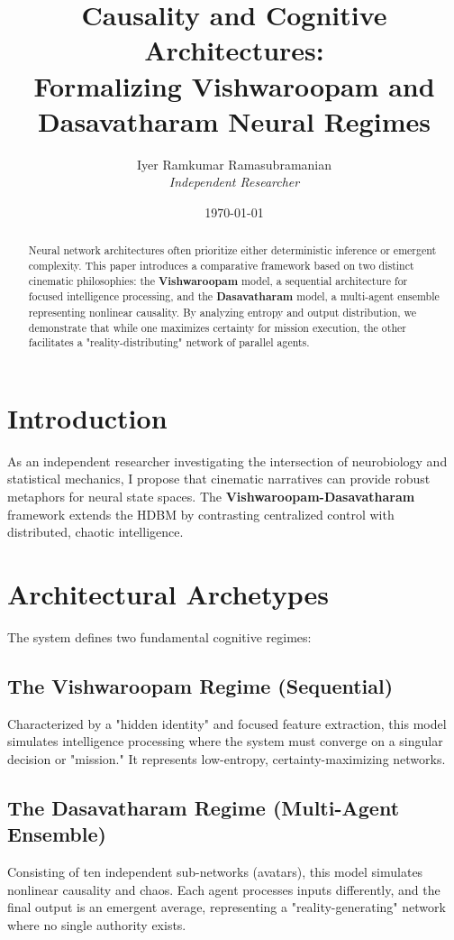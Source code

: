 \documentclass[12pt]{article}
\title{\textbf{Causality and Cognitive Architectures: \\ Formalizing Vishwaroopam and Dasavatharam Neural Regimes}}
\author{Iyer Ramkumar Ramasubramanian \\ \textit{Independent Researcher}}
\date{\today}
\begin{document}
\maketitle

\begin{abstract}
Neural network architectures often prioritize either deterministic inference or emergent complexity. This paper introduces a comparative framework based on two distinct cinematic philosophies: the \textbf{Vishwaroopam} model, a sequential architecture for focused intelligence processing, and the \textbf{Dasavatharam} model, a multi-agent ensemble representing nonlinear causality. By analyzing entropy and output distribution, we demonstrate that while one maximizes certainty for mission execution, the other facilitates a "reality-distributing" network of parallel agents.
\end{abstract}

\section{Introduction}
As an independent researcher investigating the intersection of neurobiology and statistical mechanics, I propose that cinematic narratives can provide robust metaphors for neural state spaces. The \textbf{Vishwaroopam-Dasavatharam} framework extends the HDBM by contrasting centralized control with distributed, chaotic intelligence.

\section{Architectural Archetypes}

The system defines two fundamental cognitive regimes:

\subsection{The Vishwaroopam Regime (Sequential)}
Characterized by a "hidden identity" and focused feature extraction, this model simulates intelligence processing where the system must converge on a singular decision or "mission." It represents low-entropy, certainty-maximizing networks.

\subsection{The Dasavatharam Regime (Multi-Agent Ensemble)}
Consisting of ten independent sub-networks (avatars), this model simulates nonlinear causality and chaos. Each agent processes inputs differently, and the final output is an emergent average, representing a "reality-generating" network where no single authority exists.
\end{document}
